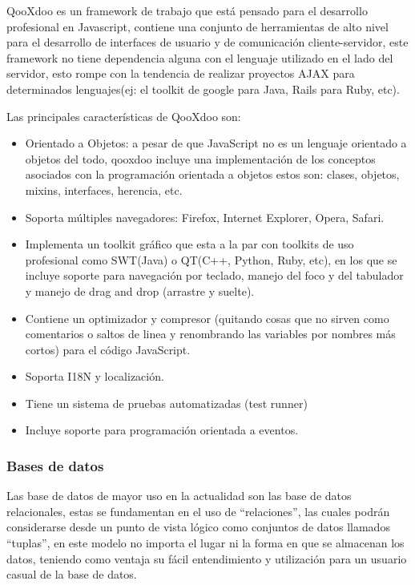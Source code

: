 QooXdoo es un framework de trabajo que está pensado para el desarrollo profesional en Javascript, contiene una conjunto de herramientas de alto nivel para el desarrollo de interfaces de usuario y de comunicación cliente-servidor, este framework no tiene dependencia alguna con el lenguaje utilizado en el lado del servidor, esto rompe con la tendencia de realizar proyectos AJAX para determinados lenguajes(ej: el toolkit de google para Java, Rails para Ruby, etc).

Las principales características de QooXdoo son:

\begin{itemize}

	\item Orientado a Objetos: a pesar de que JavaScript no es un lenguaje orientado a objetos del todo, qooxdoo incluye una implementación de los conceptos asociados con la programación orientada a objetos estos son: clases, objetos, mixins, interfaces, herencia, etc.
	
	\item Soporta múltiples navegadores: Firefox, Internet Explorer, Opera, Safari.
	
	\item Implementa un toolkit gráfico que esta a la par con toolkits de uso profesional como SWT(Java) o QT(C++, Python, Ruby, etc), en los que se incluye soporte para navegación por teclado, manejo del foco y del tabulador y manejo de drag and drop (arrastre y suelte).
	
	\item Contiene un optimizador y compresor (quitando cosas que no sirven como comentarios o saltos de linea y renombrando las variables por nombres más cortos) para el código JavaScript.
	
	\item Soporta I18N y localización.
	
	\item Tiene un sistema de pruebas automatizadas (test runner)
	
	\item Incluye soporte para programación orientada a eventos.

\end{itemize}


\subsubsection{Bases de datos}

Las base de datos de mayor uso en la actualidad son las base de datos relacionales, estas se fundamentan en el uso de ``relaciones'', las cuales podrán considerarse desde un punto de vista lógico como conjuntos de datos llamados ``tuplas'', en este modelo no importa el lugar ni la forma en que se almacenan los datos, teniendo como ventaja su fácil entendimiento y utilización para un usuario casual de la base de datos.

